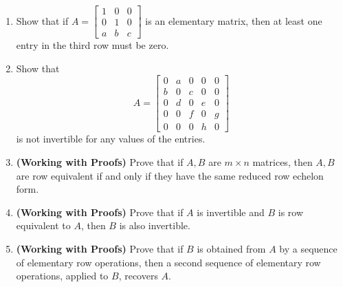 \documentclass{article}
\theoremstyle{mystyle}
\begin{document}
\begin{enumerate}
    \item[29.] Show that if $A=\begin{bmatrix}1&0&0\\0&1&0\\a&b&c\end{bmatrix}$ is an elementary matrix, then at least one entry in the third row must be zero.

    \item[30.] Show that
    \[
    A=\begin{bmatrix}0&a&0&0&0\\b&0&c&0&0\\0&d&0&e&0\\0&0&f&0&g\\0&0&0&h&0\end{bmatrix}
    \]
    is not invertible for any values of the entries.

    \item[31.] \textbf{(Working with Proofs)} Prove that if $A,B$ are $m\times n$ matrices, then $A,B$ are row equivalent if and only if they have the same reduced row echelon form.

    \item[32.] \textbf{(Working with Proofs)} Prove that if $A$ is invertible and $B$ is row equivalent to $A$, then $B$ is also invertible.

    \item[33.] \textbf{(Working with Proofs)} Prove that if $B$ is obtained from $A$ by a sequence of elementary row operations, then a second sequence of elementary row operations, applied to $B$, recovers $A$.
\end{enumerate}
\end{document}
